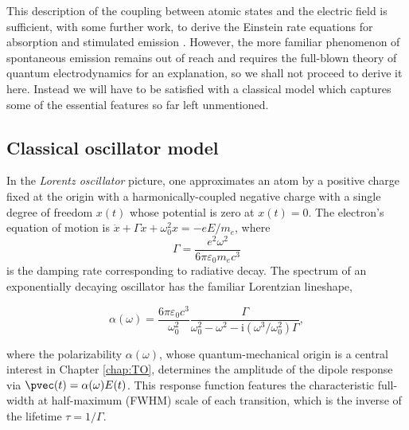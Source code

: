 	

	This description of the coupling between atomic states and the electric field is sufficient, with some further work, to derive the Einstein rate equations for absorption and stimulated emission \cite{FootAtomic}.
	However, the more familiar phenomenon of spontaneous emission remains out of reach and requires the full-blown theory of quantum electrodynamics for an explanation, so we shall not proceed to derive it here.
	Instead we will have to be satisfied with a classical model which captures some of the essential features so far left unmentioned.



	\subsection*{Classical oscillator model}

	In the \emph{Lorentz oscillator} picture, one approximates an atom by a positive charge fixed at the origin with a harmonically-coupled negative charge with a single degree of freedom $x(t)$ whose potential is zero at $x(t)=0$.
	The electron's equation of motion is $\ddot{x} + \Gamma\dot{x} + \omega_0^2x = -e E/m_e$, where
	\begin{equation}
		\Gamma = \frac{e^2\omega^2}{6\pi \varepsilon_0 m_e c^3}
	\end{equation}
	is the damping rate corresponding to radiative decay.
	The spectrum of an exponentially decaying oscillator has the familiar Lorentzian lineshape,

	\begin{equation}
		\alpha(\omega) = \frac{6\pi\varepsilon_0c^3}{\omega_0^2}\frac{\Gamma}{\omega_0^2-\omega^2-\textrm{i}(\omega^3/\omega_0^2)\Gamma},
		\label{eqn:lorentzian}
	\end{equation}

	where the polarizability $\alpha(\omega)$, whose quantum-mechanical origin is a central interest in Chapter \ref{chap:TO}, determines the amplitude of the dipole response via $\pvec(t) = \alpha(\omega)E(t)$.
	This response function features the characteristic full-width at half-maximum (FWHM) scale of each transition, which is the inverse of the lifetime $\tau=1/\Gamma$.

